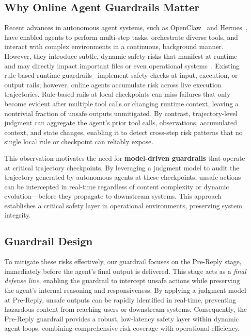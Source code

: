 \documentclass{llmxive}
\providecommand{\prereply}{{Pre-Reply}\xspace}
\begin{document}
\subsection{Why Online Agent Guardrails Matter}
\label{sec:online_guardrail_motivation}
Recent advances in autonomous agent systems, such as OpenClaw~\citep{steinberger2026openclaw} and Hermes~\citep{nousresearch2026hermes}, have enabled agents to perform multi-step tasks, orchestrate diverse tools, and interact with complex environments in a continuous, background manner. However, they introduce subtle, dynamic safety risks that manifest at runtime and may directly impact important files or even operational systems~\citep{narajala2025securingagenticai, he2024securityaiagents}. Existing rule-based runtime guardrails~\citep{
    deng2026tamingopenclaw,
    liu2026clawkeeper,
    zhang2026deepsight} implement safety checks at input, execution, or output rails; however, online agents accumulate risk across live execution trajectories. Rule-based rails at local checkpoints can miss failures that only become evident after multiple tool calls or changing runtime context, leaving
a nontrivial fraction of unsafe outputs unmitigated. By contrast, trajectory-level judgment can aggregate the agent's prior tool calls, observations, accumulated context, and state changes, enabling it to detect cross-step risk patterns that no single local rule or checkpoint can reliably expose.


This observation motivates the need for \textbf{model-driven guardrails} that operate at critical trajectory checkpoints. By leveraging a judgment model to audit the trajectory generated by autonomous agents at these checkpoints, unsafe actions can be intercepted in real-time regardless of content complexity or dynamic evolution—before they propagate to downstream systems. This approach establishes a critical safety layer in operational environments, preserving system integrity.

\subsection{Guardrail Design}
\label{sec:online_guardrail_design}

To mitigate these risks effectively, our guardrail focuses on the \prereply{} stage, immediately before the agent's final output is delivered. This stage acts as a \emph{final defense line}, enabling the guardrail to intercept unsafe actions while preserving the agent's internal reasoning and responsiveness. By applying a judgment model at \prereply{}, unsafe outputs can be rapidly identified in real-time, preventing hazardous content from reaching users or downstream systems. Consequently, the \prereply{} guardrail provides a robust, low-latency safety layer within dynamic agent loops, combining comprehensive risk coverage with operational efficiency.
\end{document}
